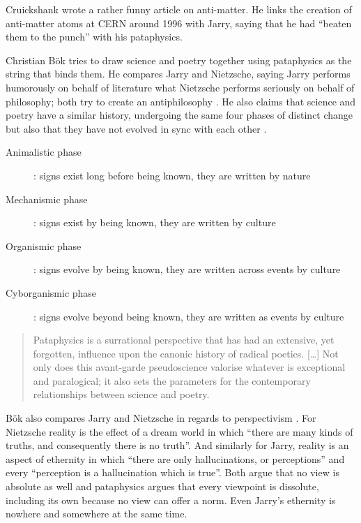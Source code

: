 Cruickshank \citep{Cruickshank} wrote a rather funny article on anti-matter. He links the creation of anti-matter atoms at CERN around 1996 with Jarry, saying that he had ``beaten them to the punch'' with his pataphysics.

Christian Bök \citep{Bok2002} tries to draw science and poetry together using pataphysics as the string that binds them. He compares Jarry and Nietzsche, saying Jarry performs humorously on behalf of literature what Nietzsche performs seriously on behalf of philosophy; both try to create an antiphilosophy \citep[p.9]{Bok2002}. He also claims that science and poetry have a similar history, undergoing the same four phases of distinct change but also that they have not evolved in sync with each other \citep[p.15]{Bok2002}.

\begin{description}
  \item [Animalistic phase]: signs exist long before being known, they are written by nature
  \item	[Mechanismic phase]: signs exist by being known, they are written by culture
  \item [Organismic phase]: signs evolve by being known, they are written across events by culture
  \item	[Cyborganismic phase]: signs evolve beyond being known, they are written as events by culture
\end{description}

\begin{quote}
  Pataphysics is a surrational perspective that has had an extensive, yet forgotten, influence upon the canonic history of radical poetics. […] Not only does this avant-garde pseudoscience valorise whatever is exceptional and paralogical; it also sets the parameters for the contemporary relationships between science and poetry. \citep[p.27]{Bok2002}
\end{quote}

Bök also compares Jarry and Nietzsche in regards to perspectivism \citep[p.31]{Bok2002}. For Nietzsche reality is the effect of a dream world in which ``there are many kinds of truths, and consequently there is no truth''. And similarly for Jarry, reality is an aspect of ethernity in which ``there are only hallucinations, or perceptions'' and every ``perception is a hallucination which is true''. Both argue that no view is absolute as well and pataphysics argues that every viewpoint is dissolute, including its own because no view can offer a norm. Even Jarry's ethernity is nowhere and somewhere at the same time.

